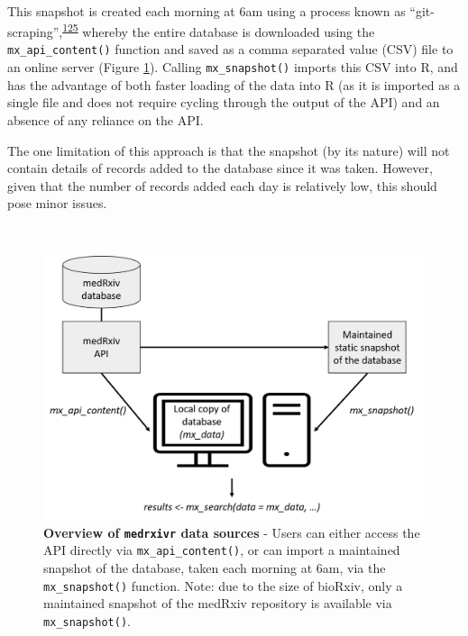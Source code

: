 \documentclass[a4paper, twoside]{templates/ociamthesis}
\begin{document}
~

This snapshot is created each morning at 6am using a process known as ``git-scraping'',\textsuperscript{\protect\hyperlink{ref-zotero-15031}{125}} whereby the entire database is downloaded using the \texttt{mx\_api\_content()} function and saved as a comma separated value (CSV) file to an online server (Figure \ref{fig:medrxivr-data-sources}). Calling \texttt{mx\_snapshot()} imports this CSV into R, and has the advantage of both faster loading of the data into R (as it is imported as a single file and does not require cycling through the output of the API) and an absence of any reliance on the API.

The one limitation of this approach is that the snapshot (by its nature) will not contain details of records added to the database since it was taken. However, given that the number of records added each day is relatively low, this should pose minor issues.

~





\begin{figure}[H]
\includegraphics[width=1\linewidth]{figures/sys-rev-tools/data_sources} \caption[Overview of \texttt{medrxivr} data sources]{\textbf{Overview of \texttt{medrxivr} data sources} - Users can either access the API directly via \texttt{mx\_api\_content()}, or can import a maintained snapshot of the database, taken each morning at 6am, via the \texttt{mx\_snapshot()} function. Note: due to the size of bioRxiv, only a maintained snapshot of the medRxiv repository is available via \texttt{mx\_snapshot()}.}\label{fig:medrxivr-data-sources}
\end{figure}
\end{document}
